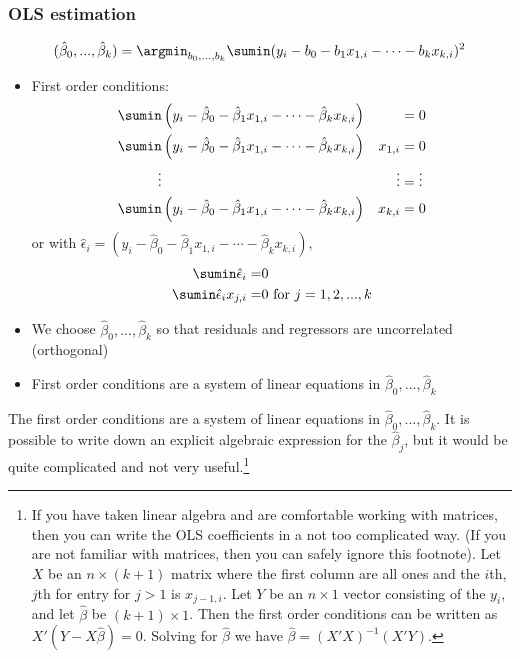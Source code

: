 \begin{frame}[allowframebreaks]
  \frametitle{OLS estimation}
  \begin{align*}
    (\hat{\beta}_0, ..., \hat{\beta}_k) = \argmin_{b_0, ..., b_k}
    \sumin (y_i - b_0 - b_1 x_{1,i} - \cdots - b_k x_{k,i})^2 
  \end{align*}
  \begin{itemize}
  \item First order conditions:
    \begin{align*}
      \sumin & \left(y_i - \hat{\beta}_0 - \hat{\beta}_1 x_{1,i} -
        \cdots - \hat{\beta}_k x_{k,i} \right) & & = 0 \\
      \sumin & \left(y_i - \hat{\beta}_0 - \hat{\beta}_1 x_{1,i} -
        \cdots - \hat{\beta}_k x_{k,i} \right) &x_{1,i} & = 0 \\
      \vdots & & \vdots  & =  \vdots \\
      \sumin & \left(y_i - \hat{\beta}_0 - \hat{\beta}_1 x_{1,i} -
        \cdots - \hat{\beta}_k x_{k,i} \right) &x_{k,i} & = 0 
    \end{align*}
    or with $\hat{\epsilon}_i = \left(y_i - \hat{\beta}_0 -
      \hat{\beta}_1 x_{1,i} - \cdots - \hat{\beta}_k x_{k,i} \right)$,
    \begin{align*}
      \sumin \hat{\epsilon}_i = & 0 \\
      \sumin \hat{\epsilon}_i x_{j,i} = & 0 \text{ for } j=1,2,...,k
    \end{align*}
  \item We choose $\hat{\beta}_0, ..., \hat{\beta}_k$ so that
    residuals and regressors are uncorrelated (orthogonal)
  \item First order conditions are a system of linear equations in
    $\hat{\beta}_0, ..., \hat{\beta}_k$
  \end{itemize}

\end{frame}

The first order conditions are a system of linear equations in
$\hat{\beta}_0, ..., \hat{\beta}_k$. It is possible to write down an
explicit algebraic expression for the $\hat{\beta}_j$, but it would be
quite complicated and not very useful.\footnote{If you have taken
  linear algebra and are comfortable working with matrices, then you
  can write the OLS coefficients in a not too complicated way. (If you
  are not familiar with matrices, then you can safely ignore this
  footnote). Let $X$ be an $n \times (k+1)$ matrix where the first
  column are all ones and the $i$th, $j$th for entry for $j>1$ is
  $x_{j-1,i}$. Let $Y$ be an $n \times 1$ vector consisting of the
  $y_i$, and let $\hat{\beta}$ be $(k+1) \times 1$.  Then the first
  order conditions can be written as $X'(Y - X \hat{\beta}) =
  0$.
  Solving for $\hat{\beta}$ we have $\hat{\beta} = (X'X)^{-1}
  (X'Y)$. } 

